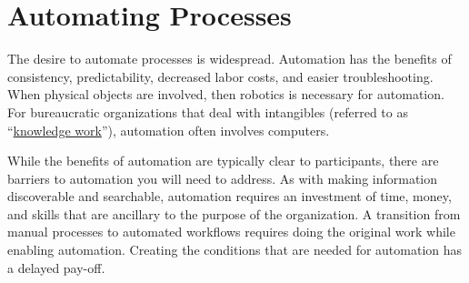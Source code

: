 \section{Automating Processes\label{sec:automating-processes}}




The desire to automate processes is widespread. Automation has the benefits of consistency, predictability, decreased labor costs, and easier troubleshooting. 
When physical objects are involved, then robotics is necessary for automation. 
For bureaucratic organizations that deal with intangibles (referred to as ``\href{https://en.wikipedia.org/wiki/Knowledge_worker}{knowledge work}''),  automation often involves computers.

While the benefits of automation are typically clear to participants, there are barriers to automation you will need to address.  
As with making information discoverable and searchable, automation requires an investment of time, money, and skills that are ancillary to the purpose of the organization. A transition from manual processes to automated workflows requires doing the original work while enabling automation. Creating the conditions that are needed for automation has a delayed pay-off. 


